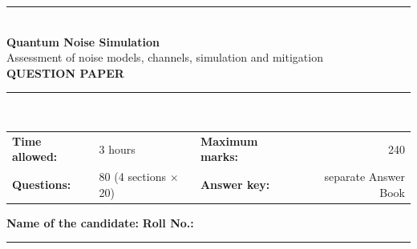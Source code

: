 \documentclass[11pt,a4paper]{article}
\begin{document}
\pagestyle{fancy}\fancyhf{}
\renewcommand{\headrulewidth}{0.4pt}

\thispagestyle{empty}
\begin{center}
{\color{brand}\rule{\linewidth}{1.2pt}}\\[6pt]
{\Huge\bfseries\color{brand} Quantum Noise Simulation}\\[4pt]
{\Large Assessment of noise models, channels, simulation and mitigation}\\[4pt]
{\large\bfseries QUESTION PAPER}\\[2pt]
{\color{brand}\rule{\linewidth}{1.2pt}}\\[1pt]
\end{center}
\vspace{-2pt}
\begin{tabularx}{\linewidth}{@{}lXlr@{}}
\textbf{Time allowed:} & 3 hours & \textbf{Maximum marks:} & 240\\
\textbf{Questions:} & 80 (4 sections $\times$ 20) & \textbf{Answer key:} & separate Answer Book
\end{tabularx}
\vspace{6pt}

\textbf{Name of the candidate:} \hrulefill\quad \textbf{Roll No.:} \rule{35mm}{0.4pt}
\end{document}

